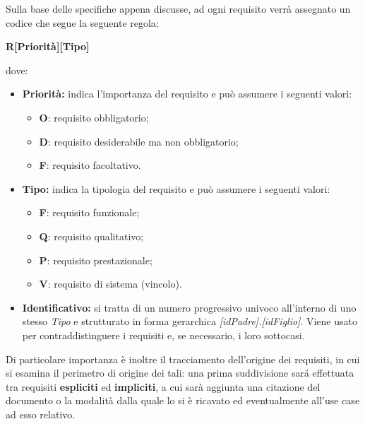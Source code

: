 Sulla base delle specifiche appena discusse, ad ogni requisito verrà assegnato un codice che segue la seguente regola:
\begin{center}
    \textbf{R[Priorità][Tipo]\textunderscore[Identificativo]}
\end{center}
dove:
\begin{itemize}
    \item \textbf{Priorità:} indica l'importanza del requisito e può assumere i seguenti valori:
        \begin{itemize}
            \item \textbf{O}: requisito obbligatorio;
            \item \textbf{D}: requisito desiderabile ma non obbligatorio;
            \item \textbf{F}: requisito facoltativo.
        \end{itemize}                 
    \item \textbf{Tipo:} indica la tipologia del requisito e può assumere i seguenti valori:
        \begin{itemize}
            \item \textbf{F}: requisito funzionale;
            \item \textbf{Q}: requisito qualitativo;
            \item \textbf{P}: requisito prestazionale;
            \item \textbf{V}: requisito di sistema (vincolo).
        \end{itemize}             
    \item \textbf{Identificativo:} si tratta di un numero progressivo univoco all'interno di uno stesso \textit{Tipo} e strutturato in forma gerarchica \textit{[idPadre].[idFiglio]}. Viene usato per contraddistinguere i requisiti e, se necessario, i loro sottocasi.
\end{itemize}
Di particolare importanza è inoltre il tracciamento dell'origine dei requisiti, in cui si esamina il perimetro di origine dei tali: una prima suddivisione sará effettuata tra requisiti \textbf{espliciti} ed \textbf{impliciti}, a cui sarà aggiunta una citazione del documento o la modalità dalla quale lo si è ricavato ed eventualmente all'use case ad esso relativo.


